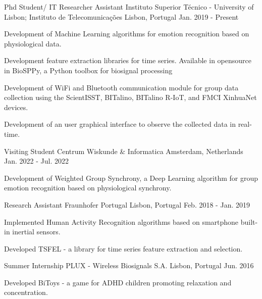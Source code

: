 \begin{cventries}
  \cventry
    {Phd Student/ IT Researcher Assistant} %
    {Instituto Superior Técnico - University of Lisbon; Instituto de Telecomunicações} %
    {Lisbon, Portugal} %
    {Jan. 2019 - Present} %
    {
      \begin{cvitems} %
        \item {Development of Machine Learning algorithms for emotion recognition based on physiological data.}
        \item {Development feature extraction libraries for time series. Available in opensource in BioSPPy, a Python toolbox for biosignal processing}
        \item {Development of WiFi and Bluetooth communication module for group data collection using the ScientISST, BITalino, BITalino R-IoT, and FMCI XinhuaNet devices.}
        \item {Development of an user graphical interface to observe the collected data in real-time.}
      \end{cvitems}
    }
\cventry
{Visiting Student} %
{Centrum Wiskunde \& Informatica} %
{Amsterdam, Netherlands} %
{Jan. 2022 - Jul. 2022} %
{
  \begin{cvitems} %
    \item {Development of Weighted Group Synchrony, a Deep Learning algorithm for group emotion recognition based on physiological synchrony.}
  \end{cvitems}
}
\cventry
{Research Assistant} %
{Fraunhofer Portugal} %
{Lisbon, Portugal} %
{Feb. 2018 - Jan. 2019} %
{
  \begin{cvitems} %
    \item {Implemented Human Activity Recognition algorithms based on smartphone built-in inertial sensors.}
    \item {Developed TSFEL - a library for time series feature extraction and selection.}
  \end{cvitems}
}
\cventry
{Summer Internship} %
{PLUX - Wireless Biosignals S.A.} %
{Lisbon, Portugal} %
{Jun. 2016} %
{
  \begin{cvitems} %
    \item {Developed BiToys - a game for ADHD children promoting relaxation and concentration.}
  \end{cvitems}
}
\end{cventries}
